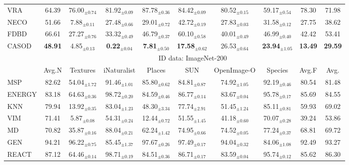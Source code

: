 \begin{table}[t!]
{\begin{tabular}{|l|c|cccccc|c|c|}
VRA      &  64.39  & 76.00$_{\pm  0.74}$  & 81.92$_{\pm  0.09}$  & 87.78$_{\pm  0.36}$  & 84.42$_{\pm  0.09}$  & 80.52$_{\pm  0.15}$  & 59.17$_{\pm  0.54}$  & 78.30  & 71.98 \\
NECO     &  51.66  &  7.88$_{\pm  0.11}$  & 27.48$_{\pm  0.66}$  & 29.01$_{\pm  0.72}$  & 42.72$_{\pm  0.19}$  & 27.83$_{\pm  0.03}$  & 31.58$_{\pm  0.12}$  & 27.75  & 38.62 \\
FDBD     & 66.61  & 27.27$_{\pm  0.76}$  & 33.32$_{\pm  0.49}$  & 46.79$_{\pm  0.37}$  & 60.10$_{\pm  0.58}$  & 40.01$_{\pm  0.49}$  & 46.99$_{\pm  0.40}$  & 42.42  & 53.41 \\ \hline
CASOD    &  \textbf{48.91}  &  4.85$_{\pm  0.13}$  &  \textbf{0.22}$_{\pm  0.04}$  &  \textbf{7.81}$_{\pm  0.50}$  & \textbf{17.58}$_{\pm  0.62}$  & 26.53$_{\pm  0.64}$  & \textbf{23.94}$_{\pm  1.05}$  & \textbf{13.49}  & \textbf{29.59} \\ \hline
			\multirow{2}{*}{} &  \multicolumn{9}{c|}{ID data: ImageNet-200}  \\ \cline{2-10}
			&  Avg.N & Textures  & iNaturalist  & Places  & SUN & OpenImage-O & Species & Avg.F & Avg. \\ \hline
            MSP    & 82.62 & 54.04$_{\pm 1.72}$ & 91.46$_{\pm 1.01}$ & 85.80$_{\pm 0.62}$ & 84.81$_{\pm 0.87}$ & 74.92$_{\pm 1.05}$ & 92.19$_{\pm 0.46}$ & 80.54 & 81.48 \\
ENERGY & 83.18 & 64.63$_{\pm 0.36}$ & 98.72$_{\pm 0.20}$ & 84.59$_{\pm 0.46}$ & 86.77$_{\pm 0.14}$ & 83.67$_{\pm 0.04}$ & 95.78$_{\pm 0.17}$ & 85.69 & 84.55 \\
KNN    & 79.94 & 13.92$_{\pm 0.35}$ & 83.04$_{\pm 1.23}$ & 48.30$_{\pm 3.34}$ & 77.74$_{\pm 2.91}$ & 51.45$_{\pm 1.24}$ & 85.11$_{\pm 0.81}$ & 59.93 & 69.02 \\
VIM    &71.41 &  5.87$_{\pm 0.08}$ & 54.31$_{\pm 0.24}$ & 12.44$_{\pm 0.72}$ & 51.55$_{\pm 1.45}$ & 41.18$_{\pm 0.60}$ & 70.07$_{\pm 0.28}$ & 39.24 & 53.86 \\
MD     & 70.82 & 35.87$_{\pm 0.16}$ & 88.04$_{\pm 0.21}$ & 62.24$_{\pm 1.42}$ & 74.95$_{\pm 0.66}$ & 74.52$_{\pm 0.05}$ & 77.24$_{\pm 0.37}$ & 68.81 & 69.72 \\
GEN    & 94.21 & 96.22$_{\pm 0.75}$ & 85.45$_{\pm 1.37}$ & 97.67$_{\pm 0.26}$ & 97.49$_{\pm 0.17}$ & 94.04$_{\pm 0.32}$ & 84.06$_{\pm 1.08}$ & 92.49 & 93.27 \\
REACT  & 87.12 & 64.46$_{\pm 0.14}$ & 98.71$_{\pm 0.19}$ & 84.51$_{\pm 0.36}$ & 86.71$_{\pm 0.17}$ & 83.59$_{\pm 0.04}$ & 95.74$_{\pm 0.12}$ & 85.62 & 86.30 \\

\end{tabular}}
\end{table}
